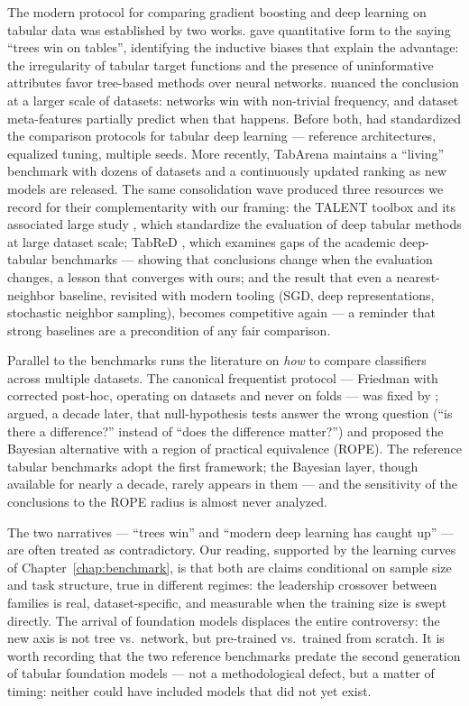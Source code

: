 The modern protocol for comparing gradient boosting and deep learning
on tabular data was established by two works. \citet{grinsztajn2022}
gave quantitative form to the saying ``trees win on tables'',
identifying the inductive biases that explain the advantage: the
irregularity of tabular target functions and the presence of
uninformative attributes favor tree-based methods over neural
networks. \citet{mcelfresh2023} nuanced the conclusion at a larger
scale of datasets: networks win with non-trivial frequency, and
dataset meta-features partially predict when that happens. Before
both, \citet{gorishniy2021} had standardized the comparison protocols
for tabular deep learning --- reference architectures, equalized
tuning, multiple seeds. More recently, TabArena \citep{tabarena2025}
maintains a ``living'' benchmark with dozens of datasets and a
continuously updated ranking as new models are released. The same
consolidation wave produced three resources we record for their
complementarity with our framing: the TALENT toolbox
\citep{talent2024} and its associated large study \citep{ye2024closer},
which standardize the evaluation of deep tabular methods at large
dataset scale; TabReD \citep{tabred2024}, which examines gaps of the
academic deep-tabular benchmarks --- showing that conclusions change
when the evaluation changes, a lesson that converges with ours; and the
result that even a nearest-neighbor baseline, revisited with modern
tooling (SGD, deep representations, stochastic neighbor sampling),
becomes competitive again \citep{modernnca2025} --- a reminder that
strong baselines are a precondition of any fair comparison.

Parallel to the benchmarks runs the literature on \emph{how} to
compare classifiers across multiple datasets. The canonical
frequentist protocol --- Friedman with corrected post-hoc, operating
on datasets and never on folds --- was fixed by \citet{demsar2006};
\citet{benavoli2017} argued, a decade later, that null-hypothesis
tests answer the wrong question (``is there a difference?'' instead
of ``does the difference matter?'') and proposed the Bayesian
alternative with a region of practical equivalence (ROPE). The
reference tabular benchmarks adopt the first framework; the Bayesian
layer, though available for nearly a decade, rarely appears in them
--- and the sensitivity of the conclusions to the ROPE radius is
almost never analyzed.

The two narratives --- ``trees win'' \citep{grinsztajn2022} and
``modern deep learning has caught up'' \citep{realmlp2024,tabm2025}
--- are often treated as contradictory. Our reading, supported by
the learning curves of Chapter~\ref{chap:benchmark}, is that both
are claims conditional on sample size and task structure, true in
different regimes: the leadership crossover between families is
real, dataset-specific, and measurable when the training size is
swept directly. The arrival of foundation models displaces the
entire controversy: the new axis is not tree vs.\ network, but
pre-trained vs.\ trained from scratch. It is worth recording that
the two reference benchmarks predate the second generation of
tabular foundation models --- not a methodological defect, but a
matter of timing: neither could have included models that did not
yet exist.

